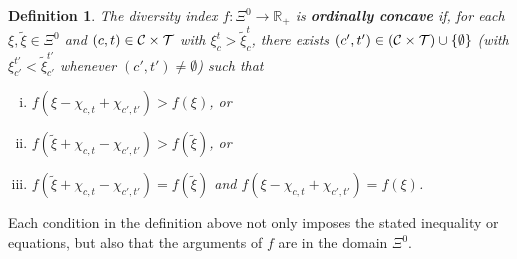 \documentclass[12pt]{amsart}
\newtheorem{definition}{Definition}
\theoremstyle{remark}
\begin{document}
\begin{comment}
\begin{definition}\label{def:ordinal}
The diversity index $f: \Xi^0 \rightarrow \mathbb{R}_+$ is \textbf{ordinally concave} if, for every $\xi,\tilde{\xi}\in \Xi^0$
and $(c,t) \in \calc \times \calt$ with  $\xi_c^t>\tilde{\xi}_c^t$, then one of the following holds:
\begin{enumerate}[(i)]
\item $f(\xi-\chi_{c,t})> f(\xi)$, or
\item $f(\tilde{\xi}+\chi_{c,t}) > f(\tilde{\xi})$, or
\item $f(\tilde{\xi}+\chi_{c,t})=f(\tilde{\xi})$ and $f(\xi-\chi_{c,t})=f(\xi)$,
\end{enumerate}
or there exists $(c',t') \in \calc \times \calt$ with $\xi_{c'}^{t'}<\tilde{\xi}_{c'}^{t'}$ such that one of the following holds:
\begin{enumerate}[(i)]
\item[(iv)] $f(\xi-\chi_{c,t}+\chi_{c',t'})> f(\xi)$, or
\item[(v)] $f(\tilde{\xi}+\chi_{c,t}-\chi_{c',t'}) > f(\tilde{\xi})$, or
\item[(vi)] $f(\tilde{\xi}+\chi_{c,t}-\chi_{c',t'})=f(\tilde{\xi})$ and $f(\xi-\chi_{c,t}+\chi_{c',t'})=f(\xi)$.
\end{enumerate}
\end{definition}
\end{comment}

\begin{definition}\label{def:ordinal}
The diversity index $f: \Xi^0 \rightarrow \mathbb{R}_+$ is \textbf{ordinally concave} if, for each $\xi,\tilde{\xi}\in \Xi^0$
and $(c,t) \in \mathcal{C} \times \mathcal{T}$ with  $\xi_c^t>\tilde{\xi}_c^t$, there exists $(c',t') \in (\mathcal{C} \times \mathcal{T}) \cup \{\emptyset\}$
(with $\xi_{c'}^{t'}<\tilde{\xi}_{c'}^{t'}$ whenever $(c',t')\neq \emptyset$) such that
\begin{enumerate}[(i)]
\item $f(\xi-\chi_{c,t}+\chi_{c',t'})> f(\xi)$, or
\item $f(\tilde{\xi}+\chi_{c,t}-\chi_{c',t'}) > f(\tilde{\xi})$, or
\item $f(\tilde{\xi}+\chi_{c,t}-\chi_{c',t'})=f(\tilde{\xi})$ and $f(\xi-\chi_{c,t}+\chi_{c',t'})=f(\xi)$.
\end{enumerate}
\end{definition}
Each condition in the definition above not only imposes the stated inequality
or equations, but also that the arguments of $f$ are in the domain $\Xi^0$.
\end{document}
